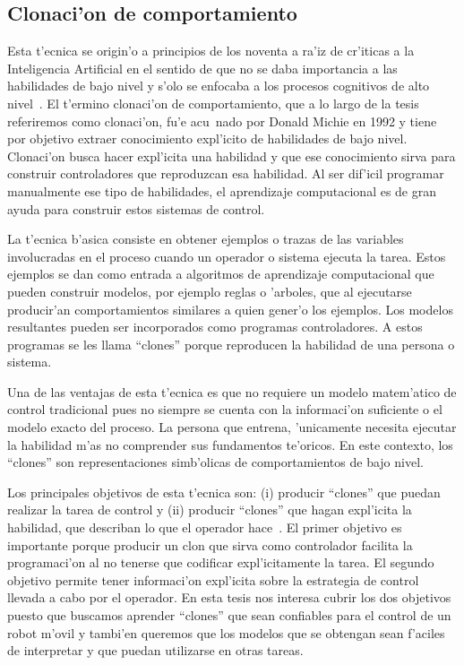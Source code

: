 \documentclass[11pt]{article}
\begin{document}
\subsection{Clonaci'on de comportamiento}

Esta t'ecnica se origin'o a principios de los noventa a ra'iz de cr'iticas a la Inteligencia Artificial en el sentido de que no se daba importancia a las habilidades de bajo nivel y s'olo se enfocaba a los procesos cognitivos de alto nivel~\cite{michiesammut:cloning}. El t'ermino \textsf{clonaci'on de comportamiento}, que a lo largo de la tesis referiremos como \textsf{clonaci'on}, fu'e acu~nado por Donald Michie en 1992 y tiene por objetivo extraer conocimiento expl'icito de habilidades de bajo nivel. \textsf{Clonaci'on} busca hacer expl'icita una habilidad y que ese conocimiento sirva para construir controladores que reproduzcan esa habilidad. Al ser dif'icil programar manualmente ese tipo de habilidades, el aprendizaje computacional es de gran ayuda para construir estos sistemas de control.

La t'ecnica b'asica consiste en obtener ejemplos o trazas de las variables involucradas en el proceso cuando un operador o sistema ejecuta la tarea. Estos ejemplos se dan como entrada a algoritmos de aprendizaje computacional que pueden construir modelos, por ejemplo reglas o 'arboles, que al ejecutarse producir'an comportamientos similares a quien gener'o los ejemplos. Los modelos resultantes pueden ser incorporados como programas controladores. A estos programas se les llama ``clones'' porque reproducen la habilidad de una persona o sistema.

Una de las ventajas de esta t'ecnica es que no requiere un modelo matem'atico de control tradicional pues no siempre se cuenta con la informaci'on suficiente o el modelo exacto del proceso. La persona que entrena, 'unicamente necesita ejecutar la habilidad m'as no comprender sus fundamentos te'oricos. En este contexto, los ``clones'' son representaciones simb'olicas de comportamientos de bajo nivel. 

Los principales objetivos de esta t'ecnica son: (i) producir ``clones'' que puedan realizar la tarea de control y (ii) producir ``clones'' que hagan expl'icita la habilidad, que describan lo que el operador hace~\cite{modellingskills}. El primer objetivo es importante porque producir un clon que sirva como controlador facilita la programaci'on al no tenerse que codificar expl'icitamente la tarea. El segundo objetivo permite tener informaci'on expl'icita sobre la estrategia de control llevada a cabo por el operador. En esta tesis nos interesa cubrir los dos objetivos puesto que buscamos aprender ``clones'' que sean confiables para el control de un robot m'ovil y tambi'en queremos que los modelos que se obtengan sean f'aciles de interpretar y que puedan utilizarse en otras tareas.  
\end{document}

